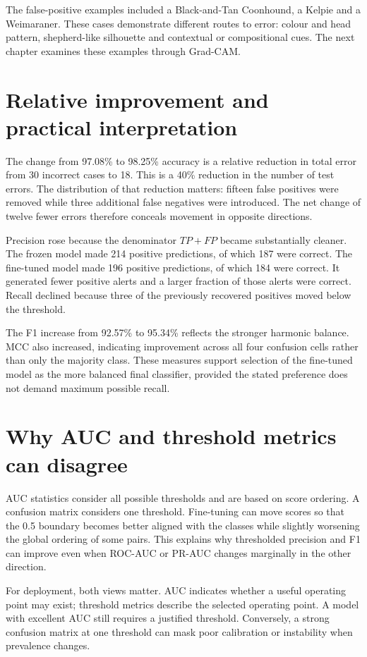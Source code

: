 The false-positive examples included a Black-and-Tan Coonhound, a Kelpie and a Weimaraner. These cases demonstrate different routes to error: colour and head pattern, shepherd-like silhouette and contextual or compositional cues. The next chapter examines these examples through Grad-CAM.

\section{Relative improvement and practical interpretation}
The change from 97.08\% to 98.25\% accuracy is a relative reduction in total error from 30 incorrect cases to 18. This is a 40\% reduction in the number of test errors. The distribution of that reduction matters: fifteen false positives were removed while three additional false negatives were introduced. The net change of twelve fewer errors therefore conceals movement in opposite directions.

Precision rose because the denominator $TP+FP$ became substantially cleaner. The frozen model made 214 positive predictions, of which 187 were correct. The fine-tuned model made 196 positive predictions, of which 184 were correct. It generated fewer positive alerts and a larger fraction of those alerts were correct. Recall declined because three of the previously recovered positives moved below the threshold.

The F1 increase from 92.57\% to 95.34\% reflects the stronger harmonic balance. MCC also increased, indicating improvement across all four confusion cells rather than only the majority class. These measures support selection of the fine-tuned model as the more balanced final classifier, provided the stated preference does not demand maximum possible recall.

\section{Why AUC and threshold metrics can disagree}
AUC statistics consider all possible thresholds and are based on score ordering. A confusion matrix considers one threshold. Fine-tuning can move scores so that the 0.5 boundary becomes better aligned with the classes while slightly worsening the global ordering of some pairs. This explains why thresholded precision and F1 can improve even when ROC-AUC or PR-AUC changes marginally in the other direction.

For deployment, both views matter. AUC indicates whether a useful operating point may exist; threshold metrics describe the selected operating point. A model with excellent AUC still requires a justified threshold. Conversely, a strong confusion matrix at one threshold can mask poor calibration or instability when prevalence changes.

